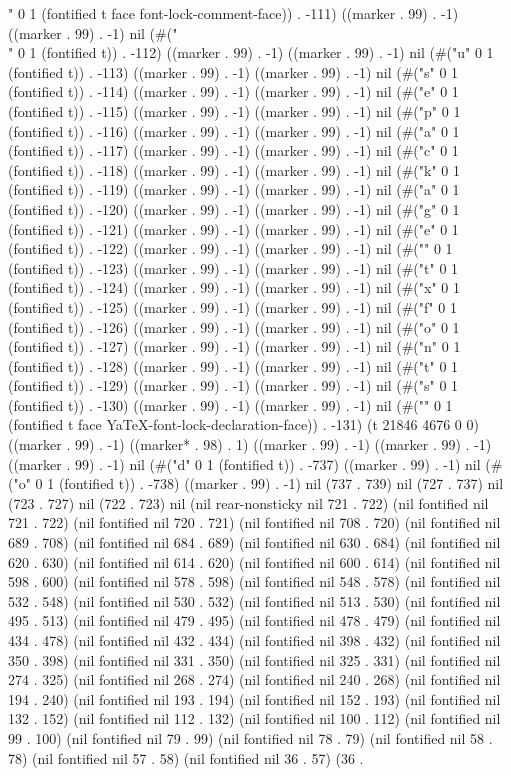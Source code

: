 " 0 1 (fontified t face font-lock-comment-face)) . -111) ((marker . 99) . -1) ((marker . 99) . -1) nil (#("\\" 0 1 (fontified t)) . -112) ((marker . 99) . -1) ((marker . 99) . -1) nil (#("u" 0 1 (fontified t)) . -113) ((marker . 99) . -1) ((marker . 99) . -1) nil (#("s" 0 1 (fontified t)) . -114) ((marker . 99) . -1) ((marker . 99) . -1) nil (#("e" 0 1 (fontified t)) . -115) ((marker . 99) . -1) ((marker . 99) . -1) nil (#("p" 0 1 (fontified t)) . -116) ((marker . 99) . -1) ((marker . 99) . -1) nil (#("a" 0 1 (fontified t)) . -117) ((marker . 99) . -1) ((marker . 99) . -1) nil (#("c" 0 1 (fontified t)) . -118) ((marker . 99) . -1) ((marker . 99) . -1) nil (#("k" 0 1 (fontified t)) . -119) ((marker . 99) . -1) ((marker . 99) . -1) nil (#("a" 0 1 (fontified t)) . -120) ((marker . 99) . -1) ((marker . 99) . -1) nil (#("g" 0 1 (fontified t)) . -121) ((marker . 99) . -1) ((marker . 99) . -1) nil (#("e" 0 1 (fontified t)) . -122) ((marker . 99) . -1) ((marker . 99) . -1) nil (#("{" 0 1 (fontified t)) . -123) ((marker . 99) . -1) ((marker . 99) . -1) nil (#("t" 0 1 (fontified t)) . -124) ((marker . 99) . -1) ((marker . 99) . -1) nil (#("x" 0 1 (fontified t)) . -125) ((marker . 99) . -1) ((marker . 99) . -1) nil (#("f" 0 1 (fontified t)) . -126) ((marker . 99) . -1) ((marker . 99) . -1) nil (#("o" 0 1 (fontified t)) . -127) ((marker . 99) . -1) ((marker . 99) . -1) nil (#("n" 0 1 (fontified t)) . -128) ((marker . 99) . -1) ((marker . 99) . -1) nil (#("t" 0 1 (fontified t)) . -129) ((marker . 99) . -1) ((marker . 99) . -1) nil (#("s" 0 1 (fontified t)) . -130) ((marker . 99) . -1) ((marker . 99) . -1) nil (#("}" 0 1 (fontified t face YaTeX-font-lock-declaration-face)) . -131) (t 21846 4676 0 0) ((marker . 99) . -1) ((marker* . 98) . 1) ((marker . 99) . -1) ((marker . 99) . -1) ((marker . 99) . -1) nil (#("d" 0 1 (fontified t)) . -737) ((marker . 99) . -1) nil (#("o" 0 1 (fontified t)) . -738) ((marker . 99) . -1) nil (737 . 739) nil (727 . 737) nil (723 . 727) nil (722 . 723) nil (nil rear-nonsticky nil 721 . 722) (nil fontified nil 721 . 722) (nil fontified nil 720 . 721) (nil fontified nil 708 . 720) (nil fontified nil 689 . 708) (nil fontified nil 684 . 689) (nil fontified nil 630 . 684) (nil fontified nil 620 . 630) (nil fontified nil 614 . 620) (nil fontified nil 600 . 614) (nil fontified nil 598 . 600) (nil fontified nil 578 . 598) (nil fontified nil 548 . 578) (nil fontified nil 532 . 548) (nil fontified nil 530 . 532) (nil fontified nil 513 . 530) (nil fontified nil 495 . 513) (nil fontified nil 479 . 495) (nil fontified nil 478 . 479) (nil fontified nil 434 . 478) (nil fontified nil 432 . 434) (nil fontified nil 398 . 432) (nil fontified nil 350 . 398) (nil fontified nil 331 . 350) (nil fontified nil 325 . 331) (nil fontified nil 274 . 325) (nil fontified nil 268 . 274) (nil fontified nil 240 . 268) (nil fontified nil 194 . 240) (nil fontified nil 193 . 194) (nil fontified nil 152 . 193) (nil fontified nil 132 . 152) (nil fontified nil 112 . 132) (nil fontified nil 100 . 112) (nil fontified nil 99 . 100) (nil fontified nil 79 . 99) (nil fontified nil 78 . 79) (nil fontified nil 58 . 78) (nil fontified nil 57 . 58) (nil fontified nil 36 . 57) (36 . 